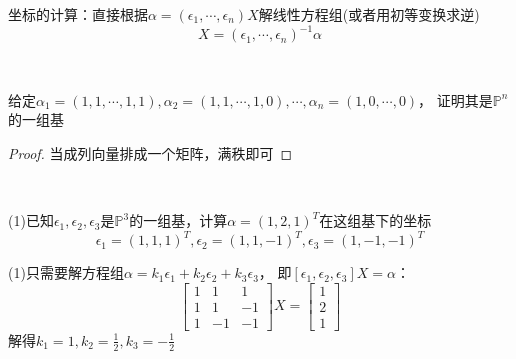 \begin{note}
  坐标的计算：直接根据$\alpha = (\epsilon_1,\cdots,\epsilon_n)X$解线性方程组(或者用初等变换求逆)
  \begin{equation*}
    X = (\epsilon_1,\cdots,\epsilon_n)^{-1}\alpha
  \end{equation*}
\end{note}


~

\begin{exercise}[证明基]
  给定$\alpha_1 = (1,1,\cdots,1,1), \alpha_2 = (1,1,\cdots,1,0),\cdots,\alpha_n = (1,0,\cdots,0)$，
  证明其是$\mathbb{P}^n$的一组基
\end{exercise}

\begin{proof}
  当成列向量排成一个矩阵，满秩即可
\end{proof}

~

\begin{exercise}[坐标的计算]
  (1)已知$\epsilon_1,\epsilon_2,\epsilon_3$是$\mathbb{P}^3$的一组基，计算$\alpha = (1,2,1)^T$在这组基下的坐标
  \begin{equation*}
    \epsilon_1 = (1,1,1)^T, \epsilon_2 = (1,1,-1)^T, \epsilon_3 = (1,-1,-1)^T
  \end{equation*}
\end{exercise}

\begin{solution}
  (1)只需要解方程组$\alpha = k_1\epsilon_1 + k_2\epsilon_2 + k_3\epsilon_3$，
  即$[\epsilon_1,\epsilon_2,\epsilon_3]X = \alpha$：
  \begin{equation*}
    \left[
      \begin{array}{ccc}
        1&1&1 \\
         1&1&-1 \\
         1&-1&-1
      \end{array}
    \right]X = \left[
      \begin{array}{c}
        1\\
        2\\
        1
      \end{array}
    \right]
  \end{equation*}
  解得$k_1 = 1, k_2 = \frac{1}{2}, k_3 = - \frac{1}{2}$
\end{solution}

~

